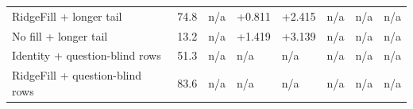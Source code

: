 \documentclass[11pt]{article}
\begin{document}
\begin{table}[H]
\begin{tabular}{llllllll}
RidgeFill + longer tail & 74.8 & n/\allowbreak{}a & +0.811 & +2.415 & n/\allowbreak{}a & n/\allowbreak{}a & n/\allowbreak{}a \\
No fill + longer tail & 13.2 & n/\allowbreak{}a & +1.419 & +3.139 & n/\allowbreak{}a & n/\allowbreak{}a & n/\allowbreak{}a \\
Identity + question-blind rows & 51.3 & n/\allowbreak{}a & n/\allowbreak{}a & n/\allowbreak{}a & n/\allowbreak{}a & n/\allowbreak{}a & n/\allowbreak{}a \\
RidgeFill + question-blind rows & 83.6 & n/\allowbreak{}a & n/\allowbreak{}a & n/\allowbreak{}a & n/\allowbreak{}a & n/\allowbreak{}a & n/\allowbreak{}a \\
\bottomrule
\end{tabular}
\end{table}
\end{document}
